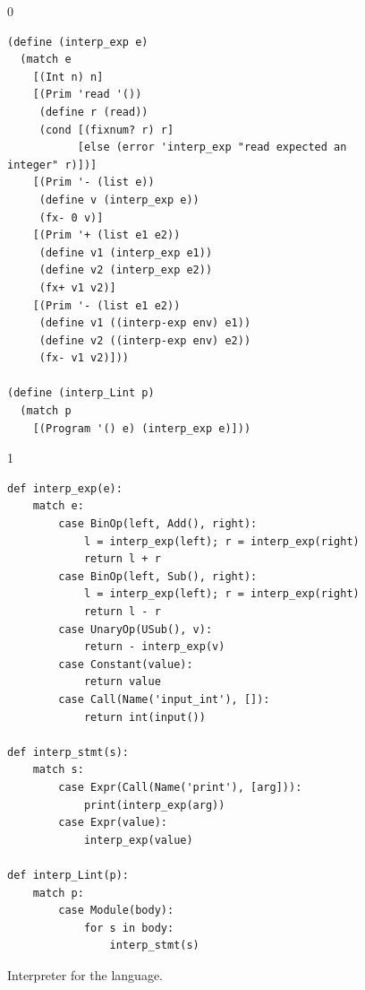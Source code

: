 \documentclass[7x10,nocrop]{TimesAPriori_MIT}%
\def\racketEd{0}
\def\pythonEd{1}
\def\edition{0}
\begin{document}
\begin{figure}[tp]
{\if\edition\racketEd
\begin{lstlisting}
(define (interp_exp e)
  (match e
    [(Int n) n]
    [(Prim 'read '())
     (define r (read))
     (cond [(fixnum? r) r]
           [else (error 'interp_exp "read expected an integer" r)])]
    [(Prim '- (list e))
     (define v (interp_exp e))
     (fx- 0 v)]
    [(Prim '+ (list e1 e2))
     (define v1 (interp_exp e1))
     (define v2 (interp_exp e2))
     (fx+ v1 v2)]
    [(Prim '- (list e1 e2))
     (define v1 ((interp-exp env) e1))
     (define v2 ((interp-exp env) e2))
     (fx- v1 v2)]))

(define (interp_Lint p)
  (match p
    [(Program '() e) (interp_exp e)]))
\end{lstlisting}
\fi}
{\if\edition\pythonEd
\begin{lstlisting}
def interp_exp(e):
    match e:
        case BinOp(left, Add(), right):
            l = interp_exp(left); r = interp_exp(right)
            return l + r
        case BinOp(left, Sub(), right):
            l = interp_exp(left); r = interp_exp(right)
            return l - r
        case UnaryOp(USub(), v):
            return - interp_exp(v)
        case Constant(value):
            return value
        case Call(Name('input_int'), []):
            return int(input())            

def interp_stmt(s):
    match s:
        case Expr(Call(Name('print'), [arg])):
            print(interp_exp(arg))
        case Expr(value):
            interp_exp(value)

def interp_Lint(p):
    match p:
        case Module(body):
            for s in body:
                interp_stmt(s)
\end{lstlisting}
\fi}
\caption{Interpreter for the \LangInt{} language.}
\label{fig:interp_Lint}
\end{figure}
\end{document}
